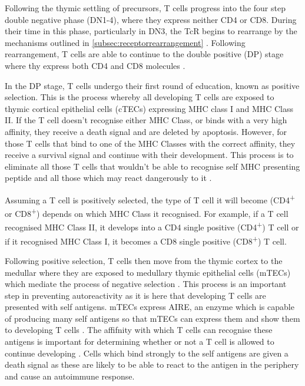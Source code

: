 Following the thymic settling of precursors, T cells progress into the four step double negative phase (DN1-4), where they express neither CD4 or CD8.
During their time in this phase, particularly in DN3, the TcR begins to rearrange by the mechanisms outlined in \cref{subsec:receptorrearrangement} \citep{Starr2003}.
Following rearrangement, T cells are able to continue to the double positive (DP) stage where thy express both CD4 and CD8 molecules \citep{Zuniga1996}.


In the DP stage, T cells undergo their first round of education, known as positive selection.
This is the process whereby all developing T cells are exposed to thymic cortical epithelial cells (cTECs) expressing MHC class I and MHC Class II.
If the T cell doesn't recognise either MHC Class, or binds with a very high affinity, they receive a death signal and are deleted by apoptosis.
However, for those T cells that bind to one of the MHC Classes with the correct affinity, they receive a survival signal and continue with their development.
This process is to eliminate all those T cells that wouldn't be able to recognise self MHC presenting peptide and all those which  may react dangerously to it \citep{Jameson1998, Starr2003}.

Assuming a T cell is positively selected, the type of T cell it will become (CD4\textsuperscript{+} or CD8\textsuperscript{+}) depends on which MHC Class it recognised.
For example, if a T cell recognised MHC Class II, it develops into a CD4 single positive (CD4\textsuperscript{+}) T cell or if it recognised MHC Class I, it becomes a CD8 single positive (CD8\textsuperscript{+}) T cell.

Following positive selection, T cells then move from the thymic cortex to the medullar where they are exposed to medullary thymic epithelial cells (mTECs) which mediate the process of negative selection \citep{Starr2003}.
This process is an important step in preventing autoreactivity as it is here that developing T cells are presented with self antigens.
mTECs express AIRE, an enzyme which is capable of producing many self antigens so that mTECs can express them and show them to developing T cells \citep{Anderson2011}.
The affifnity with which T cells can recognise these antigens is important for determining whether or not a T cell is allowed to continue developing \citep{Ashton1994}.
Cells which bind strongly to the self antigens are given a death signal as these are likely to be able to react to the antigen in the periphery and cause an autoimmune response.

